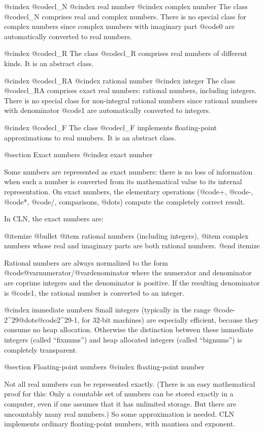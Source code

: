 @cindex @code{cl_N}
@cindex real number
@cindex complex number
The class @code{cl_N} comprises real and complex numbers. There is
no special class for complex numbers since complex numbers with imaginary
part @code{0} are automatically converted to real numbers.

@cindex @code{cl_R}
The class @code{cl_R} comprises real numbers of different kinds. It is an
abstract class.

@cindex @code{cl_RA}
@cindex rational number
@cindex integer
The class @code{cl_RA} comprises exact real numbers: rational numbers, including
integers. There is no special class for non-integral rational numbers
since rational numbers with denominator @code{1} are automatically converted
to integers.

@cindex @code{cl_F}
The class @code{cl_F} implements floating-point approximations to real numbers.
It is an abstract class.


@section Exact numbers
@cindex exact number

Some numbers are represented as exact numbers: there is no loss of information
when such a number is converted from its mathematical value to its internal
representation. On exact numbers, the elementary operations (@code{+},
@code{-}, @code{*}, @code{/}, comparisons, @dots{}) compute the completely
correct result.

In CLN, the exact numbers are:

@itemize @bullet
@item
rational numbers (including integers),
@item
complex numbers whose real and imaginary parts are both rational numbers.
@end itemize

Rational numbers are always normalized to the form
@code{@var{numerator}/@var{denominator}} where the numerator and denominator
are coprime integers and the denominator is positive. If the resulting
denominator is @code{1}, the rational number is converted to an integer.

@cindex immediate numbers
Small integers (typically in the range @code{-2^29}@dots{}@code{2^29-1},
for 32-bit machines) are especially efficient, because they consume no heap
allocation. Otherwise the distinction between these immediate integers
(called ``fixnums'') and heap allocated integers (called ``bignums'')
is completely transparent.


@section Floating-point numbers
@cindex floating-point number

Not all real numbers can be represented exactly. (There is an easy mathematical
proof for this: Only a countable set of numbers can be stored exactly in
a computer, even if one assumes that it has unlimited storage. But there
are uncountably many real numbers.) So some approximation is needed.
CLN implements ordinary floating-point numbers, with mantissa and exponent.


